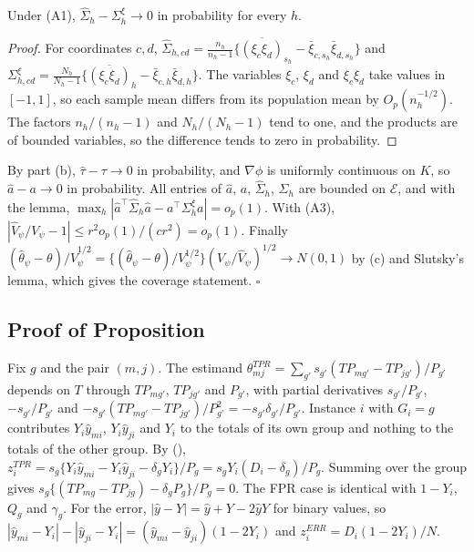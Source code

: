 \begin{lemma}\label{prop:lemma-cov}
Under (A1), $\hat\Sigma_h-\Sigma^\xi_h\to0$ in probability for every $h$.
\end{lemma}
\begin{proof}
For coordinates $c,d$,
$\hat\Sigma_{h,cd}=\frac{n_h}{n_h-1}\{\overline{(\xi_c\xi_d)}_{s_h}-\bar\xi_{c,s_h}\bar\xi_{d,s_h}\}$ and
$\Sigma^\xi_{h,cd}=\frac{N_h}{N_h-1}\{\overline{(\xi_c\xi_d)}_{h}-\bar\xi_{c,h}\bar\xi_{d,h}\}$. The variables
$\xi_c$, $\xi_d$ and $\xi_c\xi_d$ take values in $[-1,1]$, so each sample mean differs from its population
mean by $O_p(n_h^{-1/2})$. The factors $n_h/(n_h-1)$ and $N_h/(N_h-1)$ tend to one, and the products
are of bounded variables, so the difference tends to zero in probability.
\end{proof}

By part (b), $\hat\tau-\tau\to0$ in probability, and $\nabla\phi$ is uniformly continuous on $K$, so
$\hat a-a\to0$ in probability. All entries of $\hat a$, $a$, $\hat\Sigma_h$, $\Sigma_h$ are bounded
on $\mathcal E$, and with the lemma, $\max_h|\hat a^\top\hat\Sigma_h\hat a-a^\top\Sigma^\xi_ha|=o_p(1)$.
With (A3), $|\hat V_\psi/V_\psi-1|\le r^2o_p(1)/(cr^2)=o_p(1)$. Finally
$(\hat\theta_\psi-\theta)/\hat V_\psi^{1/2}=\{(\hat\theta_\psi-\theta)/V_\psi^{1/2}\}(V_\psi/\hat V_\psi)^{1/2}\to N(0,1)$ by (c)
and Slutsky's lemma, which gives the coverage statement. $\square$

\subsection{Proof of Proposition~}

Fix $g$ and the pair $(m,j)$. The estimand $\theta^{TPR}_{mj}=\sum_{g'}s_{g'}(TP_{mg'}-TP_{jg'})/P_{g'}$
depends on $T$ through $TP_{mg'}$, $TP_{jg'}$ and $P_{g'}$, with partial derivatives
$s_{g'}/P_{g'}$, $-s_{g'}/P_{g'}$ and $-s_{g'}(TP_{mg'}-TP_{jg'})/P_{g'}^2=-s_{g'}\delta_{g'}/P_{g'}$.
Instance $i$ with $G_i=g$ contributes $Y_i\hat y_{mi}$, $Y_i\hat y_{ji}$ and $Y_i$ to the totals
of its own group and nothing to the totals of the other group. By (),
$z^{TPR}_i=s_g\{Y_i\hat y_{mi}-Y_i\hat y_{ji}-\delta_gY_i\}/P_g=s_gY_i(D_i-\delta_g)/P_g$. Summing
over the group gives $s_g\{(TP_{mg}-TP_{jg})-\delta_gP_g\}/P_g=0$. The FPR case is identical with
$1-Y_i$, $Q_g$ and $\gamma_g$. For the error, $|\hat y-Y|=\hat y+Y-2\hat yY$ for binary values,
so $|\hat y_{mi}-Y_i|-|\hat y_{ji}-Y_i|=(\hat y_{mi}-\hat y_{ji})(1-2Y_i)$ and
$z^{ERR}_i=D_i(1-2Y_i)/N$.


